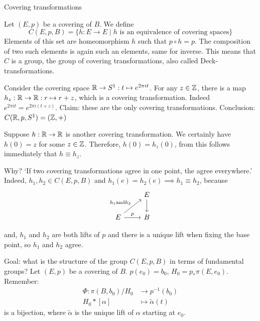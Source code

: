 \setcounter{section}{75}
Covering transformations

\begin{definition}
    Let $(E, p)$ be a covering of $B$.
    We define \[
        C(E, p, B) = \{ h: E \to  E  \mid  \text{$h$ is an equivalence of covering spaces}\}
    \]
    Elements of this set are homeomorphism $h$ such that $p  \circ  h = p$.
    The composition of two such elements is again such an elements, same for inverse.
    This means that $C$ is a group, the group of covering transformations, also called Deck-transformations.
\end{definition}

\begin{eg}
    Consider the covering space $\mathbb{R} \to  S^1: t \mapsto e^{ 2\pi i t}$.
    For any $z \in \mathbb{Z}$, there is a map $h_z: \mathbb{R} \to \mathbb{R}: r \mapsto r + z$, which is a covering transformation. Indeed $e^{2 \pi it} = e^{2 \pi i (t + z)}$.
    Claim: these are the only covering transformations.
    Conclusion: $C(\mathbb{R}, p, S^{1}) = (\mathbb{Z}, +)$
\end{eg}
\begin{explanation}
    Suppose $h: \mathbb{R} \to \mathbb{R}$ is another covering transformation.
    We certainly have $h(0) = z$ for some $z \in \mathbb{Z}$.
    Therefore, $h(0) = h_z(0)$, from this follows immediately that $ h \equiv h_z$.

    Why?  `If two covering transformations agree in one point, the agree everywhere.'
    Indeed, $h_1, h_2 \in C(E, p, B)$ and $h_1(e) = h_2(e) \implies h_1 \equiv h_2$, because 
    \[
        \begin{tikzcd}
            & E \arrow[d, ""]\\
            E \arrow[ur, "h_1 \text{and} h_2"]\arrow[r, "p"] & B
        \end{tikzcd}
    \]

    and, $h_1$ and $h_2$ are both lifts of $p$ and there is a unique lift when fixing the base point, so $h_1$ and $h_2$ agree.
\end{explanation}

Goal: what is the structure of the group $C(E, p, B)$ in terms of fundamental groups?
Let $(E, p)$ be a covering of $B$. $p(e_0) = b_0$, $H_0 = p_*\pi(E,e_0)$.
Remember:
\begin{align*}
    \Phi: \pi(B,b_0) / H_0 &\longrightarrow p^{-1}(b_0) \\
    H_0 * [\alpha] &\longmapsto \tilde{\alpha}(t)
\end{align*}
is a bijection, where $\tilde{\alpha}$ is the unique lift of $\alpha$ starting at $e_0$.

